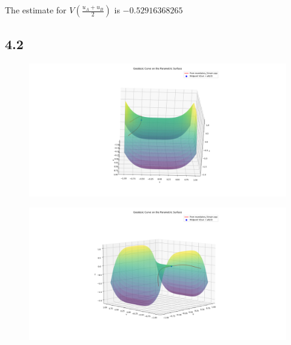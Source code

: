 \documentclass{article}
\begin{document}
The estimate for $V\left(\frac{u_A+u_B}{2}\right)$ is $-0.52916368265$
\subsection*{4.2}

\begin{figure}[h]
    \begin{center}
        \includegraphics[width=\textwidth]{../plot_front.png}
    \end{center}
\end{figure}
\begin{figure}[h]
    \begin{center}
        \includegraphics[width=\textwidth]{../plot_side.png}
    \end{center}
\end{figure}
\end{document}
